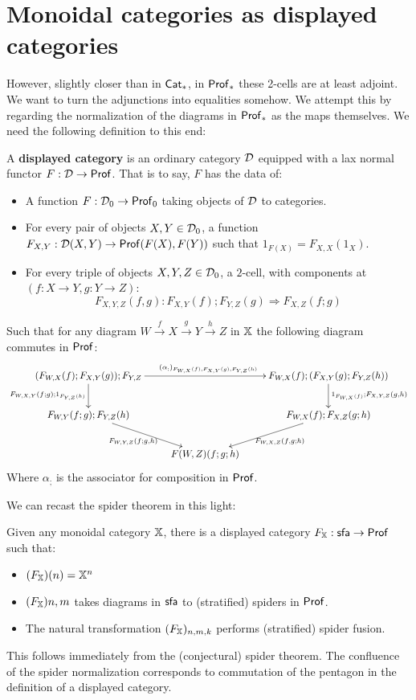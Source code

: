 \section{Monoidal categories as displayed categories}
 However, slightly closer than in ${\sf Cat}_*$, in ${\sf Prof}_*$ these 2-cells are at least adjoint.  We want to turn the adjunctions into equalities somehow.  We attempt this by regarding the normalization of the diagrams in ${\sf Prof}_*$ as the maps themselves.  
We need the following definition to this end:
\begin{definition}
A {\bf displayed category} is an ordinary category $\mathcal{D}$ equipped with a lax normal functor $F:\mathcal{D}\to {\sf Prof}$.
That is to say, $F$ has the data of:
\begin{itemize}
\item A function $F:\mathcal{D}_0\to {\sf Prof}_0$ taking objects of $\mathcal{D}$ to categories.
\item For every pair of objects $X,Y \in \mathcal{D}_0$, a function $F_{X,Y}:\mathcal{D}(X,Y)\to {\sf Prof}(F(X),F(Y))$  such that $1_{F(X)}=F_{X,X}(1_X)$.
\item For every triple of objects $X,Y,Z \in \mathcal{D}_0$, a $2$-cell, with components at $(f:X\to Y,g:Y\to Z)$:
$$F_{X,Y,Z}(f,g):F_{X,Y}(f);F_{Y,Z}(g) \Rightarrow F_{X,Z}(f;g)$$
\end{itemize}
Such that for any diagram $W\xrightarrow{f} X \xrightarrow{g} Y \xrightarrow{h} Z$ in $\mathbb{X}$ the following diagram commutes in ${\sf Prof}$:
$$
\xymatrix{
(F_{W,X}(f);F_{X,Y}(g));F_{Y,Z} \ar[d]_{F_{W,X,Y}(f;g);1_{F_{Y,Z}(h)}} \ar[rr]^{(\alpha_;)_{F_{W,X}(f),F_{X,Y}(g),F_{Y,Z}(h)}}
  & & F_{W,X}(f);(F_{X,Y}(g);F_{Y,Z}(h)) \ar[d]^{1_{F_{W,X}(f)};F_{X,Y,Z}(g,h)}\\
F_{W,Y}(f;g);F_{Y,Z}(h) \ar[dr]_{F_{W,Y,Z}(f;g,h) \ \ }
  && F_{W,X}(f);F_{X,Z}(g;h) \ar[dl]^{\ \ F_{W,X,Z}(f,g;h)}\\
  & F(W,Z)(f;g;h)
}
$$
Where $\alpha_;$ is the associator for composition in ${\sf Prof}$.
\end{definition}
We can recast the spider theorem in this light:
\begin{lemma}
Given any monoidal category $\mathbb{X}$, there is a displayed category
$F_{\mathbb{X}}:{\sf sfa}\to {\sf Prof}$ such that:
\begin{itemize}
\item $(F_{\mathbb{X}})(n) = \mathbb{X}^n$
\item $(F_{\mathbb{X}}){n,m}$ takes diagrams in ${\sf sfa}$ to (stratified) spiders in ${\sf Prof}$.
\item The natural transformation $(F_{\mathbb{X}})_{n,m,k}$ performs (stratified) spider fusion.
\end{itemize}
\end{lemma}
This follows immediately from the  (conjectural) spider theorem.
The confluence of the spider normalization corresponds to commutation of the pentagon in the definition of a displayed category.

